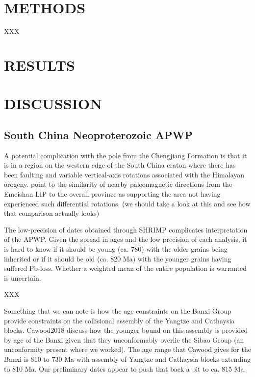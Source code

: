 \documentclass[11pt,letterpaper]{article}
\begin{document}

\section*{METHODS}

XXX

\section*{RESULTS}


\section*{DISCUSSION}

\subsection*{South China Neoproterozoic APWP}

A potential complication with the pole from the Chengjiang Formation is that it is in a region on the western edge of the South China craton where there has been faulting and variable vertical-axis rotations associated with the Himalayan orogeny. \cite{Jing2019a} point to the similarity of nearby paleomagnetic directions from the Emeishan LIP to the overall province as supporting the area not having experienced such differential rotations. (we should take a look at this and see how that comparison actually looks)

The low-precision of dates obtained through SHRIMP complicates interpretation of the APWP. Given the spread in ages and the low precision of each analysis, it is hard to know if it should be young (ca. 780) with the older grains being inherited or if it should be old (ca. 820 Ma) with the younger grains having suffered Pb-loss. Whether a weighted mean of the entire population is warranted is uncertain.

XXX

Something that we can note is how the age constraints on the Banxi Group provide constraints on the collisional assembly of the Yangtze and Cathaysia blocks. Cawood2018 discuss how the younger bound on this assembly is provided by age of the Banxi given that they unconformably overlie the Sibao Group (an unconformity present where we worked). The age range that Cawood gives for the Banxi is 810 to 730 Ma with assembly of Yangtze and Cathaysia blocks extending to 810 Ma. Our preliminary dates appear to push that back a bit to ca. 815 Ma.
\end{document}
